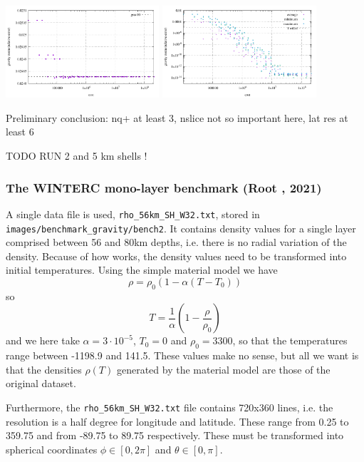 \begin{center}
\includegraphics[width=5.7cm]{./images/benchmark_gravity/bench1/grav_cost}
\includegraphics[width=5.7cm]{./images/benchmark_gravity/bench1/grav_cost_error}\\
\end{center}

Preliminary conclusion: nq+ at least 3, nslice not so important here, lat res at least 6


TODO RUN 2 and 5 km shells !


\newpage
\subsubsection{The WINTERC mono-layer benchmark (Root \etal, 2021)}

A single data file is used,  {\tt rho\_56km\_SH\_W32.txt}, 
stored in {\tt images/benchmark\_gravity/bench2}. 
It contains density values for a single layer comprised between 56 and 80km depths, 
i.e. there is no radial variation of the density. 
Because of how \aspect{} works, the density values need to be transformed into 
initial temperatures. Using the simple material model we have
\[
\rho = \rho_0 (1-\alpha(T-T_0))
\]
so 
\[
T= \frac{1}{\alpha} \left(1 - \frac{\rho}{\rho_0} \right)
\]
and we here take $\alpha = 3\cdot 10^{-5}$, $T_0=0$ and $\rho_0=3300$, so that 
the temperatures range between -1198.9 and  141.5. These values make no sense, 
but all we want is that the densities $\rho(T)$ generated by the material model 
are those of the original dataset. 

Furthermore, the {\tt rho\_56km\_SH\_W32.txt} file contains 720x360 lines, i.e. 
the resolution is a half degree for longitude and latitude. These range from 0.25
to 359.75 and from -89.75 to 89.75 respectively. These must be transformed into 
spherical coordinates $\phi\in[0,2\pi]$ and $\theta \in[0,\pi]$.


